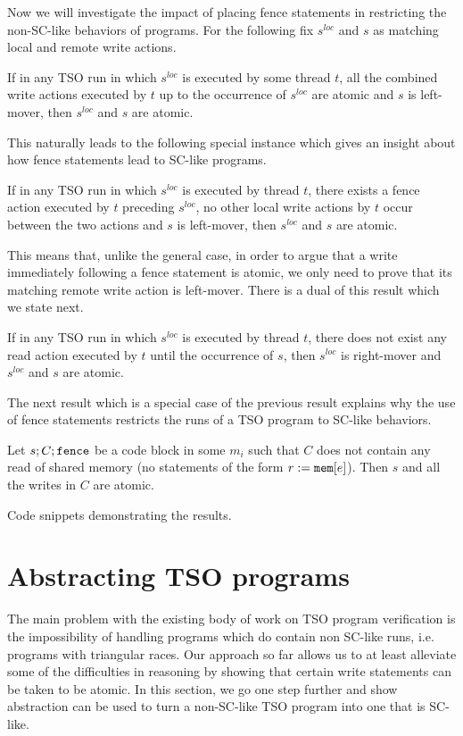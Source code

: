 \documentclass[preprint,9pt]{sigplanconf}
\begin{document}
Now we will investigate the impact of placing fence statements in restricting the non-SC-like behaviors of programs.
For the following fix $s^{loc}$ and $s$ as matching local and remote write actions.
\begin{lemma}
If in any TSO run in which $s^{loc}$ is executed by some thread $t$, all the combined write actions executed by $t$ up to the occurrence of $s^{loc}$ are atomic and $s$ is left-mover, then $s^{loc}$ and $s$ are atomic.
\end{lemma}
This naturally leads to the following special instance which gives an insight about how fence statements lead to SC-like programs.
\begin{corollary}
If in any TSO run in which $s^{loc}$ is executed by thread $t$, there exists a fence action executed by $t$ preceding $s^{loc}$, no other local write actions by $t$ occur between the two actions and $s$ is left-mover, then $s^{loc}$ and $s$ are atomic.
\end{corollary}
This means that, unlike the general case, in order to argue that a write immediately following a fence statement is atomic, we only need to prove that its matching remote write action is left-mover. 
There is a dual of this result which we state next.
\begin{lemma}
If in any TSO run in which $s^{loc}$ is executed by thread $t$, there does not exist any read action executed by $t$ until the occurrence of $s$, then $s^{loc}$ is right-mover and $s^{loc}$ and $s$ are atomic.
\end{lemma}
The next result which is a special case of the previous result explains why the use of fence statements restricts the runs of a TSO program to SC-like behaviors.
\begin{corollary}
Let $s;C;\mathtt{fence}$ be a code block in some $m_i$ such that $C$ does not contain any read of shared memory (no statements of the form $r:=\mathtt{mem}[e]$).
Then $s$ and all the writes in $C$ are atomic.
\end{corollary}


{\sc Code snippets demonstrating the results.}

\newcommand{\aliabsrulex}[1]{\textnormal{\sc\small #1}}
\newcommand{\alihavocval}{\ensuremath{\star}}

\section{Abstracting TSO programs}
\label{sec:abstracting-tso-programs}
The main problem with the existing body of work on TSO program verification is the impossibility of handling programs which do contain non SC-like runs, i.e. programs with triangular races.
Our approach so far allows us to at least alleviate some of the difficulties in reasoning by showing that certain write statements can be taken to be atomic.
In this section, we go one step further and show abstraction can be used to turn a non-SC-like TSO program into one that is SC-like.
\end{document}
